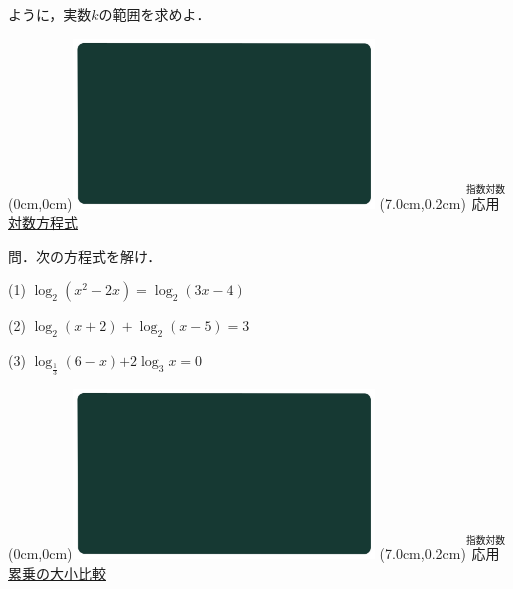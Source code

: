 \documentclass[10pt,
fleqn,
dvipdfmx,
uplatex
]{jsarticle}
\begin{document}
\large 
\vspace{0.2zw}
\hfill ように，実数$k$の範囲を求めよ．


\newpage



\at(0cm,0cm){\includegraphics[width=8cm,bb=0 0 1920 1080]{./youtube/thumbnails/templates/smart_background/指数対数.jpeg}}
\at(7.0cm,0.2cm){\small\color{bradorange}$\overset{\text{指数対数}}{\text{応用}}$}
{\color{orange}\huge\underline{対数方程式}}\vspace{0.6zw}

\small
問．次の方程式を解け．\vspace{0.4zw}

{\small (1)}  $\log _2\left(x^2-2x\right)=\log _2\left(3x-4\right)$\vspace{0.2zw}

\large
{\small (2)}  $\log _2\left(x+2\right)+\log _2\left(x-5\right)=3$\vspace{0.2zw}

\LARGE
{\small (3)}  $\log _{\frac{1}{3}}$$\left(6-x\right)$$+$$2\log _3x$$=$$0$\vspace{0.2zw}\\



\newpage



\at(0cm,0cm){\includegraphics[width=8cm,bb=0 0 1920 1080]{./youtube/thumbnails/templates/smart_background/指数対数.jpeg}}
\at(7.0cm,0.2cm){\small\color{bradorange}$\overset{\text{指数対数}}{\text{応用}}$}
{\color{orange}\LARGE\underline{累乗の大小比較}}\vspace{0.3zw}
\end{document}
